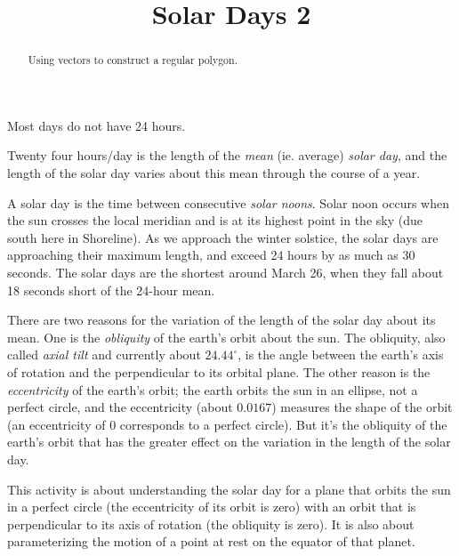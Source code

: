 \documentclass{ximera}
\title{Solar Days 2}
\begin{document}
\begin{abstract}
Using vectors to construct a regular polygon.
\end{abstract}
\maketitle


Most days do not have 24 hours.

Twenty four hours/day is the length of the \emph{mean} (ie. average) \emph{solar day}, and the length of the solar day varies about this mean through the course of a year.

A solar day is the time between consecutive \emph{solar noons}.  Solar noon occurs when the sun crosses the local meridian and is at its highest point in the sky (due south here in Shoreline). As we approach the winter solstice, the solar days are approaching their maximum length, and exceed 24 hours by as much as 30 seconds. The solar days are the shortest around March 26, when they fall about 18 seconds short of the 24-hour mean.

There are two reasons for the variation of the length of the solar day about its mean. One is the \emph{obliquity} of the earth's orbit about the sun. The obliquity, also called \emph{axial tilt} and currently about $24.44^\circ$, is the angle between the earth's axis of rotation and the perpendicular to its orbital plane. The other reason is the \emph{eccentricity} of the earth's orbit; the earth orbits the sun in an ellipse, not a perfect circle, and the eccentricity (about $0.0167$) measures the shape of the orbit (an eccentricity of $0$ corresponds to a perfect circle). But it's the obliquity of the earth's orbit that has the greater effect on the variation in the length of the solar day.

This activity is about understanding the solar day for a plane that orbits the sun in a perfect circle (the eccentricity of its orbit is zero) with an orbit that is perpendicular to its axis of rotation (the obliquity is zero). It is also about parameterizing the motion of a point at rest on the equator of that planet.
\end{document}
